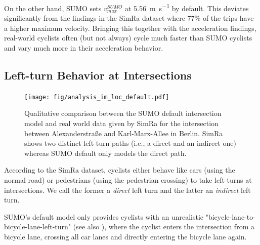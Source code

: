 On the other hand, SUMO sets $v_{max}^{SUMO}$ at \SI{5.56}{\metre\per\s} by default.
This deviates significantly from the findings in the SimRa dataset where \num{77}\% of the trips have a higher maximum velocity.
Bringing this together with the acceleration findings, real-world cyclists often (but not always) cycle much faster than SUMO cyclists and vary much more in their acceleration behavior.

\subsection{Left-turn Behavior at Intersections}
\label{subsec:left-turn_behavior_at_intersections_preprocessing}
\begin{figure}
    \centering
    \texttt{[image: fig/analysis\_im\_loc\_default.pdf]}
    \caption{%
        Qualitative comparison between the SUMO default intersection model and real world data given by SimRa for the intersection between Alexanderstraße and Karl-Marx-Allee in Berlin.
        SimRa shows two distinct left-turn paths (i.e., a direct and an indirect one) whereas SUMO default only models the direct path.
    }%
    \label{fig:analysis_im_traj_default}
\end{figure}

According to the SimRa dataset, cyclists either behave like cars (using the normal road) or pedestrians (using the pedestrian crossing) to take left-turns at intersections.
We call the former a \textit{direct} left turn and the latter an \textit{indirect} left turn.

SUMO's default model only provides cyclists with an unrealistic "bicycle-lane-to-bicycle-lane-left-turn" (see also ), where the cyclist enters the intersection from a bicycle lane, crossing all car lanes and directly entering the bicycle lane again.

